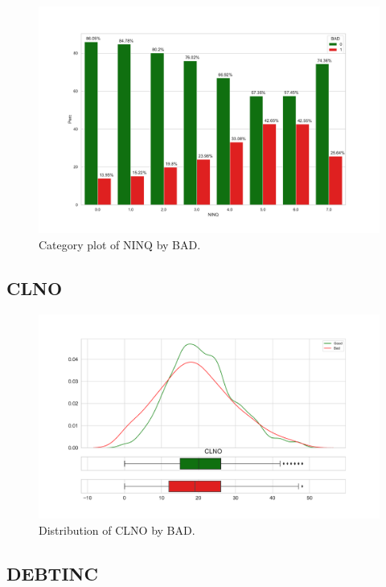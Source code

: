\begin{figure}[!ht]
	\centering
	\includegraphics[scale=0.40]{figs/ninq_cat.pdf}
	\caption{Category plot of NINQ by BAD. \label{ninq_cat}}
\end{figure}

\subsection*{CLNO}

\begin{figure}[!ht]
	\centering
	\includegraphics[scale=0.40]{figs/clno_dist.pdf}
	\caption{Distribution of CLNO by BAD. \label{clno_dist}}
\end{figure}

\subsection*{DEBTINC}

